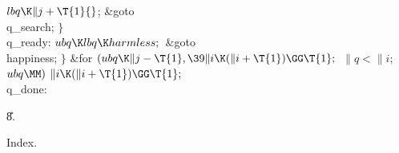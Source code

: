 ${}\\{lbq}\K\|j+\T{1}{}$;\5
\&{goto} \\{q\_search};\6
\4${}\}{}$\2\6
\4\\{q\_ready}:\5
${}\\{ubq}\K\\{lbq}\K\\{harmless};{}$\6
\&{goto} \\{happiness};\6
\4${}\}{}$\2\6
\&{for} ${}(\\{ubq}\K\|j-\T{1},\39\|i\K(\|i+\T{1})\GG\T{1};{}$ ${}\|q<\|i;{}$
${}\\{ubq}\MM){}$\1\5
${}\|i\K(\|i+\T{1})\GG\T{1};{}$\2\6
\4\\{q\_done}:\par
\U8.\fi

Index.


\fi


\inx
\fin
\con
